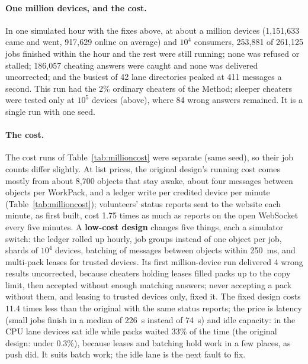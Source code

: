 \documentclass[11pt,a4paper]{article}
\theoremstyle{definition}
\theoremstyle{plain}
\begin{document}
\paragraph{One million devices, and the cost.} In one simulated hour with the fixes above, at about a million
devices (1{,}151{,}633 came and went, 917{,}629 online on average) and $10^4$ consumers, 253{,}881 of
261{,}125 jobs finished within the hour and the rest were still running; none was refused or stalled;
186{,}057 cheating answers were caught and none was delivered uncorrected; and the busiest of 42 lane
directories peaked at 411 messages a second. This run had the 2\% ordinary cheaters of the Method; sleeper
cheaters were tested only at $10^5$ devices (above), where 84 wrong answers remained. It is a single run with one
seed.

\paragraph{The cost.} The cost runs of Table~\ref{tab:millioncost} were separate (same seed), so their job counts
differ slightly. At list prices, the original design's running cost comes mostly from about
8{,}700 objects that stay awake, about four messages between objects per WorkPack, and a ledger write per credited
device per minute (Table~\ref{tab:millioncost}); volunteers' status reports sent to the website each minute, as first
built, cost 1.75 times as much as reports on the open WebSocket every five minutes. A \textbf{low-cost design} changes five things, each a simulator switch: the ledger rolled up hourly, job groups instead of one object per job, shards of $10^4$ devices,
batching of messages between objects within 250~ms, and multi-pack leases for trusted devices. Its first million-device
run delivered 4 wrong results uncorrected, because cheaters holding leases filled packs up to the copy limit,
then accepted without enough matching answers; never accepting a pack without them, and leasing to trusted
devices only, fixed it. The fixed design costs $11.4$ times less
than the original with the same status reports; the price is latency (small jobs finish in a median of 226~s instead of 74~s) and idle capacity: in the CPU lane
devices sat idle while packs waited 33\% of the time (the original design: under 0.3\%), because leases and
batching hold work in a few places, as push did. It suits batch work; the idle lane is the next fault to fix.
\end{document}
